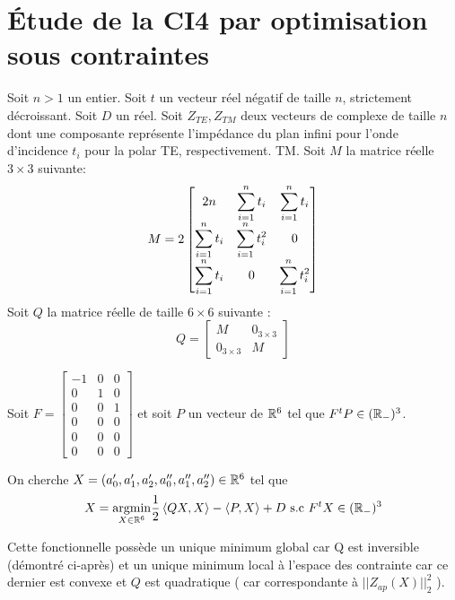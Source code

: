 \section{Étude de la CI4 par optimisation sous contraintes}

\newcommand{\st}{\ds\sum_{i=1}^n t_i}
\newcommand{\stc}{\ds\sum_{i=1}^n t_i^2 }
\newcommand{\mma}{\frac{\left(\st\right)^2 - 2n \stc}{\stc}}
\newcommand{\mmb}{\frac{\left(\st\right)^2}{\stc}}
Soit \(n>1\) un entier.
Soit \(t\) un vecteur réel négatif de taille \(n\), strictement décroissant. Soit \(D\) un réel.
Soit \(Z_{TE}, Z_{TM}\) deux vecteurs de complexe de taille \(n\) dont une composante représente l'impédance du plan infini pour l'onde d'incidence \(t_i\) pour la polar TE, respectivement. TM.
Soit \(M\) la matrice réelle \(3\times3\) suivante:
\[
M = 2\begin{bmatrix}
2n & \st & \st \\
\st & \stc & 0 \\
\st & 0 & \stc
\end{bmatrix}
\]
Soit \(Q\) la matrice réelle de taille \(6 \times 6\) suivante :
\[
Q = \begin{bmatrix}
M & 0_{3 \times 3} \\
0_{3 \times 3} & M
\end{bmatrix}
\]

Soit \(F = \begin{bmatrix}
-1 & 0 & 0 \\
0 & 1 & 0 \\
0 & 0 & 1 \\
0 & 0 & 0 \\
0 & 0 & 0 \\
0 & 0 & 0 
\end{bmatrix}\) et soit \(P\) un vecteur de \(\mathbb R^6\) tel que \( F^tP  \in (\mathbb R_-)^3\).

On cherche \(X=(a_0', a_1', a_2',a_0'',a_1'',a_2'') \in \mathbb R^6\) tel que
\begin{align}
X = {\underset{X\in \mathbb R^6}{\operatorname{argmin}}} \dfrac{1}{2}\left<QX,X\right> - \left<P,X\right> + D \text{ s.c } F^tX \in (\mathbb R_-)^3
\end{align}

Cette fonctionnelle possède un unique minimum global car Q est inversible (démontré ci-après) et un unique minimum local à l'espace des contrainte car ce dernier est convexe et  \(Q\) est quadratique ( car correspondante à \(|| Z_{ap}(X)||_2^2\) ).

